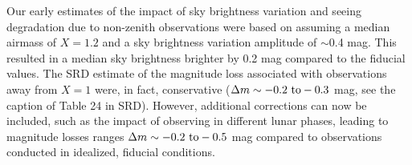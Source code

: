 \documentclass[PST,authoryear,toc]{lsstdoc}
\begin{document}
Our early estimates of the impact of sky brightness variation and
seeing degradation due to non-zenith observations were based on
assuming a median airmass of $X=1.2$ and a sky brightness variation
amplitude of $\sim$0.4 mag. This resulted in a median sky brightness brighter
by 0.2 mag compared to the fiducial values. The SRD estimate of the magnitude loss associated with observations away from $X=1$ were, in fact, conservative ($\Delta m\sim -0.2\ {\rm to} -0.3$ mag, see the caption of Table 24 in SRD). However, additional corrections can now be included, such as the impact of observing in different lunar phases, leading to magnitude losses ranges $\Delta m\sim -0.2\ {\rm to} -0.5$ mag compared to observations conducted in idealized, fiducial conditions.
\end{document}
